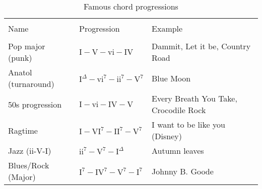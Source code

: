 
\begin{table*}[!h]
	\centering
	\caption{Famous chord progressions}
	\begin{adjustwidth}{-3cm}{}
	\begin{tabular}{p{5.0cm}p{5.5cm}p{7cm}}
		\hline \vspace{-0.2cm} \\
	    Name & Progression & Example\\
		\hline \vspace{-0.2cm} \\
		Pop major (punk)      & $\textrm{I}-\textrm{V}-\textrm{vi}-\textrm{IV}$ & Dammit, Let it be, Country Road \\
		Anatol (turnaround)   & $\textrm{I}^{\Delta}-\textrm{vi}^7-\textrm{ii}^7-\textrm{V}^7$ & Blue Moon \\
		50s progression       & $\textrm{I}-\textrm{vi}-\textrm{IV}-\textrm{V}$ & Every Breath You Take, Crocodile Rock\\
		Ragtime               &$\textrm{I}-\textrm{VI}^7-\textrm{II}^{7}-\textrm{V}^{7}$ & I want to be like you (Disney) \\
		Jazz (ii-V-I)         & $\textrm{ii}^{7}-\textrm{V}^7-\textrm{I}^{\Delta}$ & Autumn leaves\\
		Blues/Rock (Major)    & $\textrm{I}^7-\textrm{IV}^7-\textrm{V}^7-\textrm{I}^7$ & Johnny B. Goode\\


\end{tabular}
\end{adjustwidth}
\end{table*}
